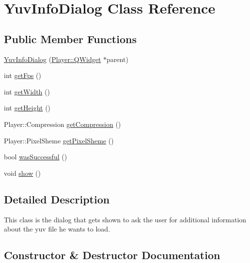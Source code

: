 \hypertarget{classPlayer_1_1YuvInfoDialog}{}\section{Yuv\+Info\+Dialog Class Reference}
\label{classPlayer_1_1YuvInfoDialog}
\subsection*{Public Member Functions}
\begin{DoxyCompactItemize}
\item 
\hyperlink{classPlayer_1_1YuvInfoDialog_a27e4695a8f05f6ffa567b6dd864d7177}{Yuv\+Info\+Dialog} (\hyperlink{classPlayer_1_1QWidget}{Player\+::\+Q\+Widget} $\ast$parent)
\item 
int \hyperlink{classPlayer_1_1YuvInfoDialog_a519ad5c0664b9de28c1a6d9dc77f959d}{get\+Fps} ()
\item 
int \hyperlink{classPlayer_1_1YuvInfoDialog_a67a0997183f24da19b776d96c1052998}{get\+Width} ()
\item 
int \hyperlink{classPlayer_1_1YuvInfoDialog_a07efb2a4e9a982688c8bb3c3f21d1092}{get\+Height} ()
\item 
Player\+::\+Compression \hyperlink{classPlayer_1_1YuvInfoDialog_a12927ed197c467bc2c804a80caee6305}{get\+Compression} ()
\item 
Player\+::\+Pixel\+Sheme \hyperlink{classPlayer_1_1YuvInfoDialog_a74cfffc5ac97d84ef5aad376d930d12b}{get\+Pixel\+Sheme} ()
\item 
bool \hyperlink{classPlayer_1_1YuvInfoDialog_a6677ab283cdae9435a6be93d9c3481b2}{was\+Successful} ()
\item 
void \hyperlink{classPlayer_1_1YuvInfoDialog_a4b148f40a95444d5669406b918ad2f52}{show} ()
\end{DoxyCompactItemize}


\subsection{Detailed Description}
This class is the dialog that gets shown to ask the user for additional information about the yuv file he wants to load. 

\subsection{Constructor \& Destructor Documentation}
\hypertarget{classPlayer_1_1YuvInfoDialog_a27e4695a8f05f6ffa567b6dd864d7177}{}

